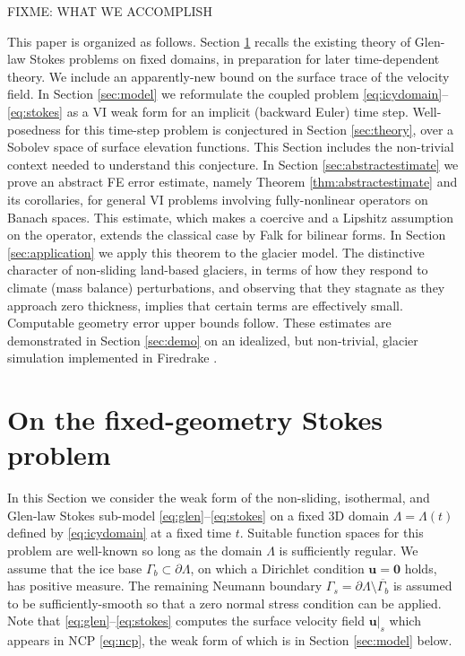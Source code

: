 \documentclass[hidelinks,onefignum,onetabnum,final]{siamart220329}  %
\newcommand{\bu}{\mathbf{u}}
\newcommand{\bzero}{\bm{0}}
\begin{document}
FIXME: WHAT WE ACCOMPLISH

This paper is organized as follows.  Section \ref{sec:stokes} recalls the existing theory of Glen-law Stokes problems on fixed domains, in preparation for later time-dependent theory.  We include an apparently-new bound on the surface trace of the velocity field.  In Section \ref{sec:model} we reformulate the coupled problem \eqref{eq:icydomain}--\eqref{eq:stokes} as a VI weak form for an implicit (backward Euler) time step.  Well-posedness for this time-step problem is conjectured in Section \ref{sec:theory}, over a Sobolev space of surface elevation functions.  This Section includes the non-trivial context needed to understand this conjecture.  In Section \ref{sec:abstractestimate} we prove an abstract FE error estimate, namely Theorem \ref{thm:abstractestimate} and its corollaries, for general VI problems involving fully-nonlinear operators on Banach spaces.  This estimate, which makes a coercive and a Lipshitz assumption on the operator, extends the classical case by Falk \cite{Falk1974} for bilinear forms.  In Section \ref{sec:application} we apply this theorem to the glacier model.  The distinctive character of non-sliding land-based glaciers, in terms of how they respond to climate (mass balance) perturbations, and observing that they stagnate as they approach zero thickness, implies that certain terms are effectively small.  Computable geometry error upper bounds follow.  These estimates are demonstrated in Section \ref{sec:demo} on an idealized, but non-trivial, glacier simulation implemented in Firedrake \cite{Hametal2023}.


\section{On the fixed-geometry Stokes problem} \label{sec:stokes}

In this Section we consider the weak form of the non-sliding, isothermal, and Glen-law Stokes sub-model \eqref{eq:glen}--\eqref{eq:stokes} on a fixed 3D domain $\Lambda = \Lambda(t)$ defined by \eqref{eq:icydomain} at a fixed time $t$.  Suitable function spaces for this problem are well-known so long as the domain $\Lambda$ is sufficiently regular.  We assume that the ice base $\Gamma_b\subset\partial \Lambda$, on which a Dirichlet condition $\bu=\bzero$ holds, has positive measure.  The remaining Neumann boundary $\Gamma_s = \partial \Lambda \setminus \overline{\Gamma_b}$ is assumed to be sufficiently-smooth so that a zero normal stress condition can be applied.  Note that \eqref{eq:glen}--\eqref{eq:stokes} computes the surface velocity field $\bu|_s$ which appears in NCP \eqref{eq:ncp}, the weak form of which is in Section \ref{sec:model} below.
\end{document}
